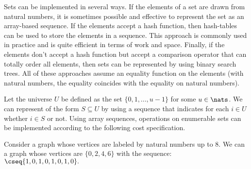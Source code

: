 \begin{gram}
Sets can be implemented in several ways. 
%
If the elements of a set are drawn from natural numbers, it is sometimes possible and effective to represent the set as an array-based sequence.
%
If the elements accept a hash function, then hash-tables can be used to store the elements in a sequence.  This approach is commonly used in practice and is quite efficient in terms of work and space.
%
Finally, if the elements don't accept a hash function but accept a comparison operator that can totally order all elements, then sets can be represented by using binary search trees.
%
All of these approaches assume an equality function on the elements (with natural numbers, the equality coincides with the equality on natural numbers).

%
\end{gram}

\begin{flex}
\label{sets:cluster:arraysets}

\begin{costspec}
\label{XXcost:sets::arrayseqs}

Let the universe $U$ be defined as the set 
%
$\{ 0, 1, \ldots, u-1 \}$
%
for some $u \in \nats$.
%
We can represent  of the form $S \subseteq U$ by using a sequence that indicates for each $i \in U$ whether $i \in S$ or not.
%
Using array sequences, operations on enumerable sets can be implemented according to the following cost specification.
 

\end{costspec}


\begin{example}
Consider a graph whose vertices are labeled by natural numbers up to $8$.  We can a graph whose vertices are
%
$\{ 0, 2, 4, 6 \}$ 
%
with the sequence:
%
$\cseq{ 1, 0, 1, 0, 1, 0, 1, 0 }.$ 
\end{example}

\end{flex}


